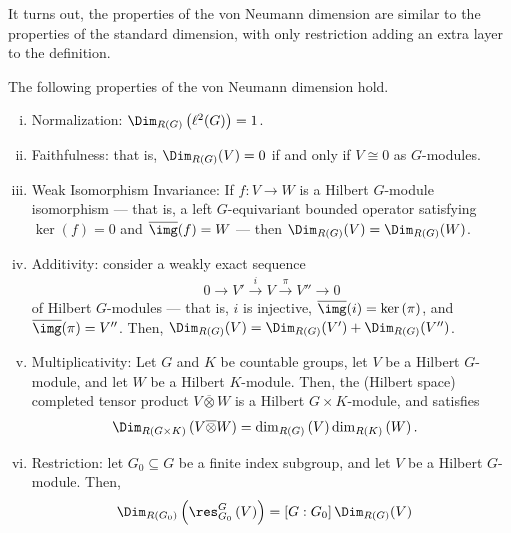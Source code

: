 \documentclass[10pt]{mypackage}
\begin{document}
It turns out, the properties of the von Neumann dimension are similar to the properties of the standard dimension, with only restriction adding an extra layer to the definition.
\begin{theorem}
  The following properties of the von Neumann dimension hold.
  \begin{enumerate}[(i)]
    \item Normalization: $\Dim_{R(G)}\left( \ell^2(G) \right) = 1$.
    \item Faithfulness: that is, $\Dim_{R(G)}(V) = 0$ if and only if $V \cong 0$ as $G$-modules.
    \item Weak Isomorphism Invariance: If $f\colon V\rightarrow W$ is a Hilbert $G$-module isomorphism --- that is, a left $G$-equivariant bounded operator satisfying $\ker\left( f \right) = 0$ and $ \overline{\img}(f) = W $ --- then $\Dim_{R(G)}(V) = \Dim_{R(G)}(W)$.
    \item Additivity: consider a weakly exact sequence
      \begin{align*}
        0\rightarrow V' \xrightarrow{i} V \xrightarrow{\pi} V'' \rightarrow 0
      \end{align*}
      of Hilbert $G$-modules --- that is, $i$ is injective, $ \overline{\img}(i) = \ker\left( \pi \right) $, and $ \overline{\img}(\pi) = V'' $. Then, $\Dim_{R(G)}(V) = \Dim_{R(G)}(V') + \Dim_{R(G)}(V'')$.
    \item Multiplicativity: Let $G$ and $K$ be countable groups, let $V$ be a Hilbert $G$-module, and let $W$ be a Hilbert $K$-module. Then, the (Hilbert space) completed tensor product $ V \overline{\otimes} W $ is a Hilbert $G\times K$-module, and satisfies
      \begin{align*}
        \Dim_{R(G\times K)} \left( V \overline{\otimes}W \right) &= \dim_{R(G)} \left( V \right) \dim_{R(K)} \left( W \right).
      \end{align*}
    \item Restriction: let $G_0\subseteq G$ be a finite index subgroup, and let $V$ be a Hilbert $G$-module. Then,
      \begin{align*}
        \Dim_{R\left( G_0 \right)} \left( \res_{G_0}^{G}\left( V \right) \right) &= \left[ G:G_0 \right]\Dim_{R(G)}(V)
      \end{align*}
  \end{enumerate}
\end{theorem}
\end{document}

